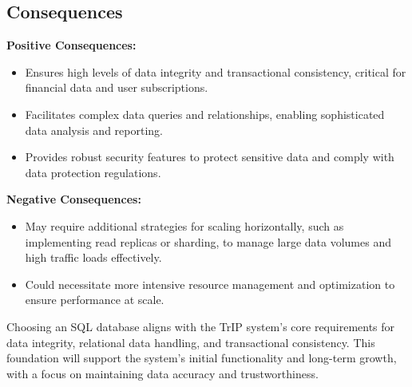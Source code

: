 \subsection*{Consequences}
\textbf{Positive Consequences:}
\begin{itemize}
    \item Ensures high levels of data integrity and transactional consistency, critical for financial data and user subscriptions.
    \item Facilitates complex data queries and relationships, enabling sophisticated data analysis and reporting.
    \item Provides robust security features to protect sensitive data and comply with data protection regulations.
\end{itemize}
\textbf{Negative Consequences:}
\begin{itemize}
    \item May require additional strategies for scaling horizontally, such as implementing read replicas or sharding, to manage large data volumes and high traffic loads effectively.
    \item Could necessitate more intensive resource management and optimization to ensure performance at scale.
\end{itemize}
Choosing an SQL database aligns with the TrIP system's core requirements for data integrity, relational data handling, and transactional consistency. This foundation will support the system's initial functionality and long-term growth, with a focus on maintaining data accuracy and trustworthiness.